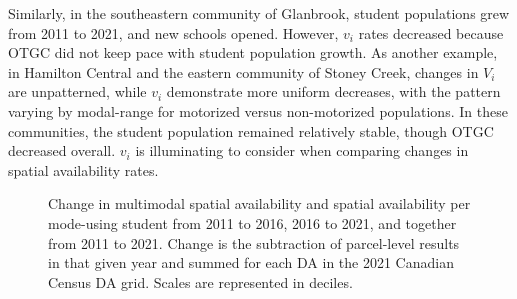 \documentclass[
default
]{sn-jnl}
\begin{document}
Similarly, in the southeastern community of Glanbrook, student
populations grew from 2011 to 2021, and new schools opened. However,
\(v_i\) rates decreased because OTGC did not keep pace with student
population growth. As another example, in Hamilton Central and the
eastern community of Stoney Creek, changes in \(V_i\) are unpatterned,
while \(v_i\) demonstrate more uniform decreases, with the pattern
varying by modal-range for motorized versus non-motorized populations.
In these communities, the student population remained relatively stable,
though OTGC decreased overall. \(v_i\) is illuminating to consider when
comparing changes in spatial availability rates.

\begin{figure}[H]


\caption{\label{fig-Fig8}Change in multimodal spatial availability and
spatial availability per mode-using student from 2011 to 2016, 2016 to
2021, and together from 2011 to 2021. Change is the subtraction of
parcel-level results in that given year and summed for each DA in the
2021 Canadian Census DA grid. Scales are represented in deciles.}

\end{figure}%
\end{document}
